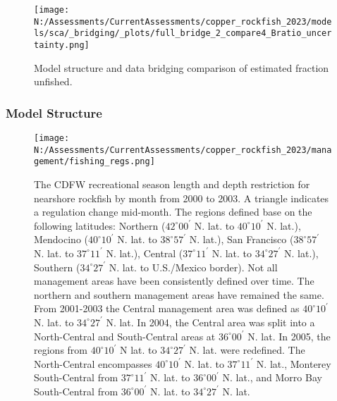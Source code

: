 \documentclass[11pt,
  english,
  letterpaper,
]{article}
\begin{document}
\pagebreak

\begin{figure}
\centering
\texttt{[image: N:/Assessments/CurrentAssessments/copper\_rockfish\_2023/models/sca/\_bridging/\_plots/full\_bridge\_2\_compare4\_Bratio\_uncertainty.png]}
\caption{Model structure and data bridging comparison of estimated fraction unfished.\label{fig:data-bridge-depl-2}}
\end{figure}

\pagebreak

\hypertarget{model-structure}{%
\subsubsection{Model Structure}\label{model-structure}}

\begin{figure}
\centering
\texttt{[image: N:/Assessments/CurrentAssessments/copper\_rockfish\_2023/management/fishing\_regs.png]}
\caption{The CDFW recreational season length and depth restriction for nearshore rockfish by month from 2000 to 2003. A triangle indicates a regulation change mid-month. The regions defined base on the following latitudes: Northern (\(42^\circ 00^\prime\) N. lat. to \(40^\circ 10^\prime\) N. lat.), Mendocino (\(40^\circ 10^\prime\) N. lat. to \(38^\circ 57^\prime\) N. lat.), San Francisco (\(38^\circ 57^\prime\) N. lat. to \(37^\circ 11^\prime\) N. lat.), Central (\(37^\circ 11^\prime\) N. lat. to \(34^\circ 27^\prime\) N. lat.), Southern (\(34^\circ 27^\prime\) N. lat. to U.S./Mexico border). Not all management areas have been consistently defined over time. The northern and southern management areas have remained the same. From 2001-2003 the Central management area was defined as \(40^\circ 10^\prime\) N. lat. to \(34^\circ 27^\prime\) N. lat. In 2004, the Central area was split into a North-Central and South-Central areas at \(36^\circ 00^\prime\) N. lat. In 2005, the regions from \(40^\circ 10^\prime\) N lat. to \(34^\circ 27^\prime\) N. lat. were redefined. The North-Central encompasses \(40^\circ 10^\prime\) N. lat. to \(37^\circ 11^\prime\) N. lat., Monterey South-Central from \(37^\circ 11^\prime\) N. lat. to \(36^\circ 00^\prime\) N. lat., and Morro Bay South-Central from \(36^\circ 00^\prime\) N. lat. to \(34^\circ 27^\prime\) N. lat.\label{fig:depth-closures}}
\end{figure}

\pagebreak
\end{document}
